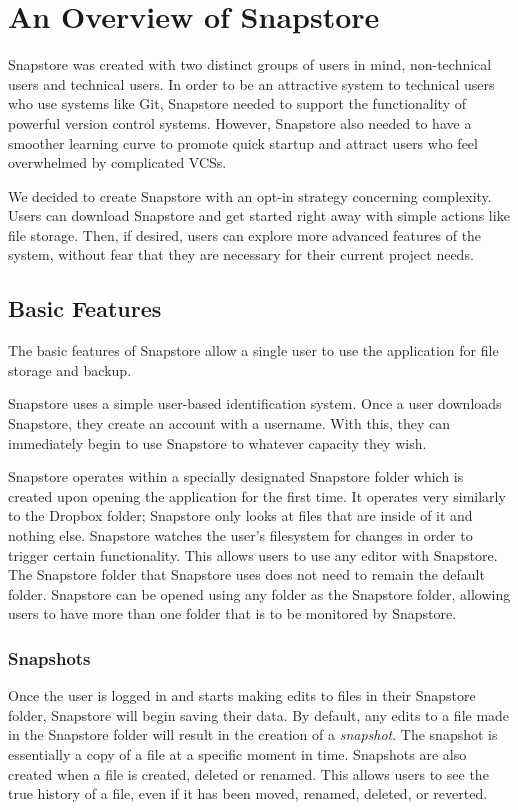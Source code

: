 \chapter{An Overview of Snapstore}

Snapstore was created with two distinct groups of users in mind, non-technical users and technical users. In order to be an attractive system to technical users who use systems like Git, Snapstore needed to support the functionality of powerful version control systems. However, Snapstore also needed to have a smoother learning curve to promote quick startup and attract users who feel overwhelmed by complicated VCSs. 

We decided to create Snapstore with an opt-in strategy concerning complexity. Users can download Snapstore and get started right away with simple actions like file storage. Then, if desired, users can explore more advanced features of the system, without fear that they are necessary for their current project needs.

\section{Basic Features}

The basic features of Snapstore allow a single user to use the application for file storage and backup.

Snapstore uses a simple user-based identification system. Once a user downloads Snapstore, they create an account with a username. With this, they can immediately begin to use Snapstore to whatever capacity they wish.

Snapstore operates within a specially designated Snapstore folder which is created upon opening the application for the first time. It operates very similarly to the Dropbox folder; Snapstore only looks at files that are inside of it and nothing else. Snapstore watches the user's filesystem for changes in order to trigger certain functionality. This allows users to use any editor with Snapstore. The Snapstore folder that Snapstore uses does not need to remain the default folder. Snapstore can be opened using any folder as the Snapstore folder, allowing users to have more than one folder that is to be monitored by Snapstore.

\subsection{Snapshots}

Once the user is logged in and starts making edits to files in their Snapstore folder, Snapstore will begin saving their data. By default, any edits to a file made in the Snapstore folder will result in the creation of a \textit{snapshot}. The snapshot is essentially a copy of a file at a specific moment in time. Snapshots are also created when a file is created, deleted or renamed. This allows users to see the true history of a file, even if it has been moved, renamed, deleted, or reverted.

